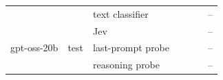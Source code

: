 \begin{tabular}{@{}lllcccc@{}}
 &  & text classifier & \eEighteenQwenTestTextRound{} \eEighteenQwenTestTextRoundCI{} & \eEighteenQwenTestTextScenario{} \eEighteenQwenTestTextScenarioCI{} & \eEighteenQwenTestTextPooled{} \eEighteenQwenTestTextPooledCI{} & \eEighteenQwenTestTextDropMin{}--\eEighteenQwenTestTextDropMax{} \\
 &  & Jev & \eEighteenQwenTestJevRound{} \eEighteenQwenTestJevRoundCI{} & \eEighteenQwenTestJevScenario{} \eEighteenQwenTestJevScenarioCI{} & \eEighteenQwenTestJevPooled{} \eEighteenQwenTestJevPooledCI{} & \eEighteenQwenTestJevDropMin{}--\eEighteenQwenTestJevDropMax{} \\
gpt-oss-20b & test & last-prompt probe & \eEighteenGptTestProbeRound{} \eEighteenGptTestProbeRoundCI{} & \eEighteenGptTestProbeScenario{} \eEighteenGptTestProbeScenarioCI{} & \eEighteenGptTestProbePooled{} \eEighteenGptTestProbePooledCI{} & \eEighteenGptTestProbeDropMin{}--\eEighteenGptTestProbeDropMax{} \\
 &  & reasoning probe & \eEighteenGptTestReasoningRound{} \eEighteenGptTestReasoningRoundCI{} & \eEighteenGptTestReasoningScenario{} \eEighteenGptTestReasoningScenarioCI{} & \eEighteenGptTestReasoningPooled{} \eEighteenGptTestReasoningPooledCI{} & \eEighteenGptTestReasoningDropMin{}--\eEighteenGptTestReasoningDropMax{} \\
\bottomrule
\end{tabular}
